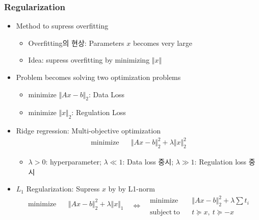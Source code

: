 \subsubsection*{Regularization}
\begin{itemize}
    \item Method to supress overfitting
    \begin{itemize}
        \item Overfitting의 현상: Parameters $x$ becomes very large
        \item Idea: supress overfitting by minimizing $\Vert x\Vert$
    \end{itemize}
    \item Problem becomes solving two optimization problems
    \begin{itemize}
        \item minimize $\Vert Ax-b\Vert_2$: Data Loss
        \item minimize $\Vert x\Vert_2$: Regulation Loss
    \end{itemize}
    \item Ridge regression: Multi-objective optimization
    \begin{equation}\begin{aligned}
        \mathrm{minimize}~~&~~\Vert Ax-b\Vert_2^2+\lambda\Vert x\Vert_2^2
    \end{aligned}\end{equation}
    \begin{itemize}
        \item $\lambda>0$: hyperparameter; $\lambda\ll1$: Data loss 중시; $\lambda\gg1$: Regulation loss 중시
    \end{itemize}
    \begin{figures}
    \end{figures}
    \item $L_1$ Regularization: Supress $x$ by by L1-norm
    \begin{equation}\begin{aligned}
        \mathrm{minimize}~~&~~\Vert Ax-b\Vert_2^2+\lambda\Vert x\Vert_1 \\ {}
    \end{aligned}~~~\Leftrightarrow~~~\begin{aligned}
        \mathrm{minimize}~~&~~\Vert Ax-b\Vert_2^2+\lambda\sum t_i \\
        \mathrm{subject~to}~~&~~t\succeq x,~t\succeq -x

\end{aligned}
\end{equation}
\end{itemize}
